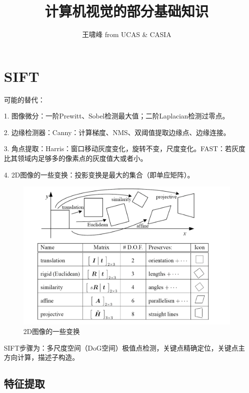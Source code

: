 \documentclass[12pt]{article}
\begin{document}
%
%

\title{计算机视觉的部分基础知识}
\author{王啸峰 from UCAS \& CASIA} %

\maketitle

\section{SIFT}
可能的替代：

1. 图像微分：一阶Prewitt、Sobel检测最大值；二阶Laplacian检测过零点。

2. 边缘检测器：Canny：计算梯度、NMS、双阈值提取边缘点、边缘连接。

3. 角点提取：Harris：窗口移动灰度变化，旋转不变，尺度变化。FAST：若灰度比其领域内足够多的像素点的灰度值大或者小。

4. 2D图像的一些变换：投影变换是最大的集合（即单应矩阵）。
\begin{figure}[ht]
    \centering
    \includegraphics[scale=0.4]{./img/2DTrans.png}
    \caption{2D图像的一些变换}
    \label{fig:2DT}
\end{figure}

SIFT步骤为：多尺度空间（DoG空间）极值点检测，关键点精确定位，关键点主方向计算，描述子构造。
\subsection{特征提取}
\end{document}
